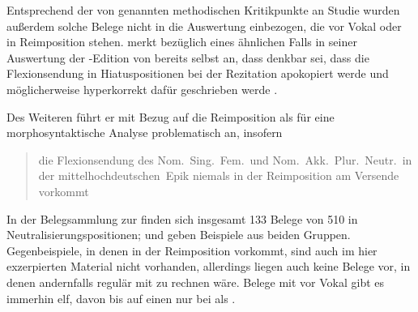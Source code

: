 \label{phsec:kchiatus}
Entsprechend der von \citet{gjelsten1980} genannten methodischen Kritikpunkte
an  Studie wurden außerdem solche Belege nicht in die
Auswertung einbezogen, die vor Vokal oder in Reimposition stehen.
\citet{askedal1973} merkt bezüglich eines ähnlichen Falls in seiner Auswertung
der -Edition von \citet{maroldschroeder1969}
bereits selbst an, dass denkbar sei, dass die Flexionsendung  in
Hiatuspositionen bei der Rezitation apokopiert werde und
möglicherweise hyperkorrekt dafür  geschrieben
werde \autocite[90--91]{askedal1973}.

Des Weiteren führt er mit Bezug auf \citet[662--663]{grimm1870} die
Reimposition als für eine morphosyntaktische Analyse problematisch
an, insofern \blockcquote[89]{askedal1973}{die Flexionsendung  des
Nom.\ Sing.\ Fem.\ und Nom.\ Akk.\ Plur.\ Neutr.\ in der
mittelhochdeutschen\ Epik niemals in der Reimposition am
Versende vorkommt}. In der Belegsammlung zur \KC{} finden sich insgesamt 133
Belege von 510 in Neutralisierungspositionen;  und
 geben Beispiele aus beiden Gruppen. Gegenbeispiele, in
denen  in der Reimposition vorkommt, sind auch im hier
exzerpierten Material nicht vorhanden, allerdings liegen auch keine Belege vor,
in denen andernfalls regulär mit  zu rechnen wäre. Belege mit
 vor Vokal gibt es immerhin elf, davon bis auf einen
 nur bei  als .

